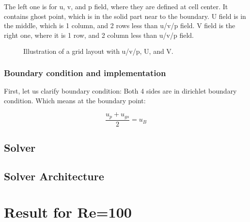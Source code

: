 \documentclass[12pt]{article}
\begin{document}
The left one is for u, v, and p field, where they are defined at cell center. It contains ghost point, which is in the solid part near to the boundary. U field is in the middle, which is 1 column, and 2 rows less than u/v/p field. V field is the right one, where it is 1 row, and 2 column less than u/v/p field.


\begin{figure}[H]
\centering
{}
\caption{Illustration of a grid layout with u/v/p, U, and V.}
\end{figure}


\subsubsection{Boundary condition and implementation}
First, let us clarify boundary condition:
Both 4 sides are in dirichlet boundary condition.
Which means at the boundary point:

$$
\frac{u_{p} + u_{gs}}{2} = u_{B}
$$












\subsection{Solver}


\subsection{Solver Architecture}



\newpage
\section{Result for Re=100}
\end{document}
